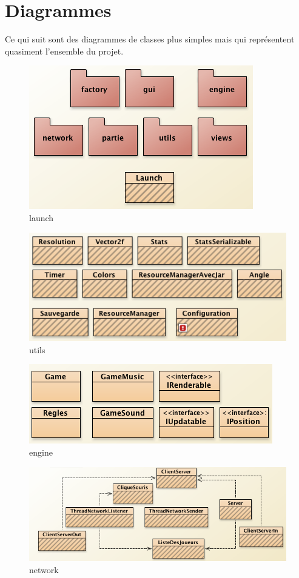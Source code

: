 \documentclass{report}
\begin{document}
\chapter{Diagrammes}\label{Diagrammes}
Ce qui suit sont des diagrammes de classes plus simples mais qui représentent quasiment l'ensemble du projet.
\begin{figure}[H]
\center
\includegraphics{launch.png}
\caption{launch}
\label{launch}
\end{figure}
\begin{figure}[H]
\center
\includegraphics{utils.png}
\caption{utils}
\label{utils}
\end{figure}
\begin{figure}[H]
\center
\includegraphics{engine.png}
\caption{engine}
\label{engine}
\end{figure}
\begin{figure}[H]
\center
\includegraphics[width=400pt]{network.png}
\caption{network}
\label{network}
\end{figure}
\end{document}
